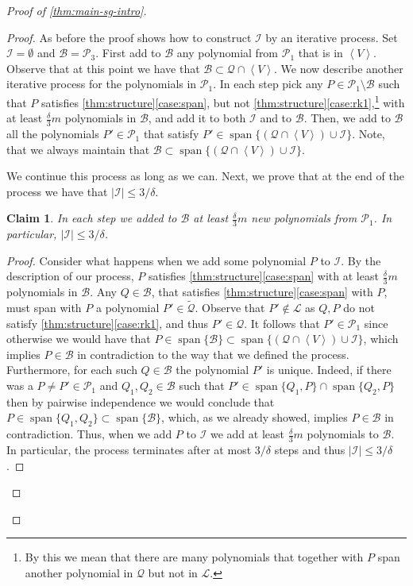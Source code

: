 \documentclass[10pt,a4paper]{article}
\newtheorem{claim}[theorem]{Claim}
\newcommand{\cB}{{\mathcal{B}}}
\newcommand{\cI}{{\mathcal{I}}}
\newcommand{\calL}{{\mathcal{L}}}
\newcommand{\cQ}{{\mathcal{Q}}}
\newcommand{\calP}{{\mathcal{P}}}
\newcommand{\ideal}[1]{\left \langle{#1}\right \rangle}
\newcommand{\spn}[1]{\operatorname{span}\{{#1}\}}
\begin{document}
\begin{proof}[Proof of \autoref{thm:main-sg-intro}]
\begin{proof}
As before the proof shows how to construct $\cI$ by an iterative process. 
Set $\cI= \emptyset$ and $\cB=\calP_3$. First add to $\cB$ any polynomial from $\calP_1$ that is in $\ideal{V}$. Observe that at this point we have that $\cB\subset \cQ\cap \ideal{V}$. We now describe another iterative process for the polynomials in $\calP_1$.
In each step pick any $P \in \calP_1\setminus \cB$ such that $P$ satisfies \autoref{thm:structure}\ref{case:span}, but not \autoref{thm:structure}\ref{case:rk1},\footnote{By this we mean that there are many polynomials that together with $P$ span another polynomial in $\cQ$ but not in $\calL$.} with at least $\frac{\delta}{3}m$ polynomials in $\cB$, and add it to both $\cI$ and to $\cB$. Then, we add to $\cB$ all the polynomials $P'\in\calP_1$ that satisfy $P' \in \spn{(\cQ \cap \ideal{V})  \cup \cI}$. Note, that we always maintain that  $\cB \subset \spn{(\cQ \cap \ideal{V})  \cup \cI}$.

We continue this process as long as we can.
Next, we prove that at the end of the process we have that $|\cI| \leq 3/\delta$.

\begin{claim}\label{cla:2nd-proc}
In each step we added to $\cB$ at least $\frac{\delta}{3}m$ new polynomials from $\calP_1$. In particular, $|\cI| \leq 3/\delta$.
\end{claim}
\begin{proof}
Consider what happens when we add some polynomial $P$ to $\cI$. By the description of our process, $P$ satisfies \autoref{thm:structure}\ref{case:span} with at least $\frac{\delta}{3}m$ polynomials in $\cB$. Any $Q\in  \cB$, that satisfies \autoref{thm:structure}\ref{case:span} with $P$,  must span with $P$ a polynomial $P'\in \tilde{\cQ}$. Observe that $P' \notin \calL$ as $Q,P$ do not satisfy \autoref{thm:structure}\ref{case:rk1}, and thus  $P'\in\cQ$. It follows that $P'\in \calP_1$ since otherwise we would have that $P\in \spn{\cB}\subset  \spn{(\cQ\cap \ideal{V}) \cup \cI}$, which implies $P\in\cB$ in contradiction to the way that we defined the process.
Furthermore, for each such $Q\in \cB$ the polynomial $P'$ is unique. Indeed, if there was a $P\neq P'\in\calP_1$ and $Q_1,Q_2\in  \cB$ such that $P'\in \spn{Q_1,P}\cap\spn{Q_2,P}$ then by pairwise independence we would conclude that $P\in \spn{Q_1,Q_2}\subset \spn{\cB}$, which, as we already showed, implies $P\in\cB$ in contradiction. Thus, when we add $P$ to $\cI$ we add at least $\frac{\delta}{3}m$ polynomials  to $\cB$. In particular, the process terminates after at most $3/\delta$ steps and thus $|\cI|\leq 3/\delta$.
\end{proof} 




\end{proof}
\end{proof}
\end{document}

